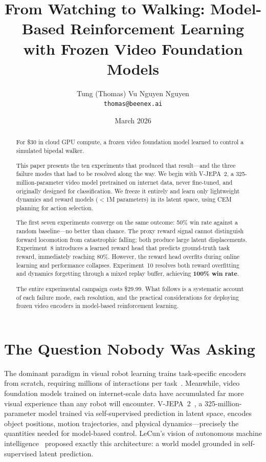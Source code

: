 \documentclass{article}
\title{\textbf{From Watching to Walking: Model-Based Reinforcement Learning\\with Frozen Video Foundation Models}}
\author{
Tung (Thomas) Vu Nguyen Nguyen \\
\texttt{thomas@beenex.ai}
}
\date{March 2026}
\begin{document}
\maketitle

\begin{abstract}
For \$30 in cloud GPU compute, a frozen video foundation model learned to control a simulated bipedal walker.

This paper presents the ten experiments that produced that result---and the three failure modes that had to be resolved along the way. We begin with V-JEPA~2, a 325-million-parameter video model pretrained on internet data, never fine-tuned, and originally designed for classification. We freeze it entirely and learn only lightweight dynamics and reward models ($<$1M parameters) in its latent space, using CEM planning for action selection.

The first seven experiments converge on the same outcome: 50\% win rate against a random baseline---no better than chance. The proxy reward signal cannot distinguish forward locomotion from catastrophic falling; both produce large latent displacements. Experiment~8 introduces a learned reward head that predicts ground-truth task reward, immediately reaching 80\%. However, the reward head overfits during online learning and performance collapses. Experiment~10 resolves both reward overfitting and dynamics forgetting through a mixed replay buffer, achieving \textbf{100\% win rate}.

The entire experimental campaign costs \$29.99. What follows is a systematic account of each failure mode, each resolution, and the practical considerations for deploying frozen video encoders in model-based reinforcement learning.
\end{abstract}

\section{The Question Nobody Was Asking}

The dominant paradigm in visual robot learning trains task-specific encoders from scratch, requiring millions of interactions per task~\citep{hafner2020dreamer, hansen2022td-mpc}. Meanwhile, video foundation models trained on internet-scale data have accumulated far more visual experience than any robot will encounter. V-JEPA~2~\citep{bardes2024vjepa}, a 325-million-parameter model trained via self-supervised prediction in latent space, encodes object positions, motion trajectories, and physical dynamics---precisely the quantities needed for model-based control. LeCun's vision of autonomous machine intelligence~\citep{lecun2022path} proposed exactly this architecture: a world model grounded in self-supervised latent prediction.
\end{document}
